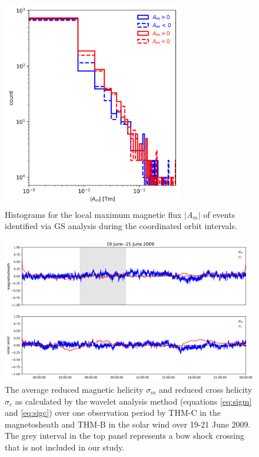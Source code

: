 \begin{figure}
    \centering
    \includegraphics[width=0.7\textwidth]{Figures/Histograms/Asplit_coordinated.png}
    \caption[Histogram of poloidal magnetic ﬂux per unit length from coordinated analysis]{Histograms for the local maximum magnetic flux $|A_m|$ of events identified via GS analysis during the coordinated orbit intervals.} %
    \label{fig:histogram-Asplit-coordinated}
\end{figure}



\begin{figure}
    \centering
    \includegraphics[width=\linewidth]{Figures/sigm_sigc_coordinated_20090619_20090621.png}
    \caption[Average reduced magnetic helicity and reduced cross helicity over time for 19-21 June 2009]{The average reduced magnetic helicity $\sigma_m$ and reduced cross helicity $\sigma_c$ as calculated by the wavelet analysis method (equations \ref{eq:sigm} and \ref{eq:sigc}) over one observation period by THM-C in the magnetosheath and THM-B in the solar wind over 19-21 June 2009. The grey interval in the top panel represents a bow shock crossing that is not included in our study.}
    \label{fig:mhd-over-time}
\end{figure}